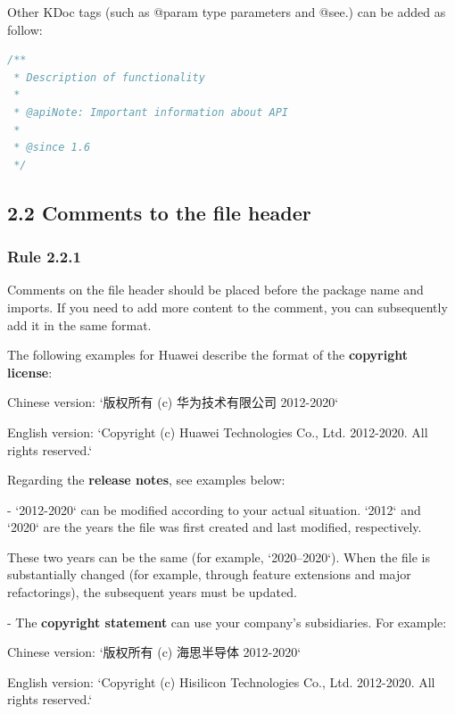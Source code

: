 Other KDoc tags (such as @param type parameters and @see.) can be added as follow:

\begin{lstlisting}[language=Kotlin]
/**
 * Description of functionality
 *
 * @apiNote: Important information about API
 *
 * @since 1.6
 */
\end{lstlisting}
\subsection*{\textbf{2.2 Comments to the file header}}

\subsubsection*{\textbf{Rule 2.2.1}}
\leavevmode\newline



Comments on the file header should be placed before the package name and imports. If you need to add more content to the comment, you can subsequently add it in the same format.



The following examples for Huawei describe the format of the \textbf{copyright license}: \

Chinese version: `版权所有 (c) 华为技术有限公司 2012-2020` \

English version: `Copyright (c) Huawei Technologies Co., Ltd. 2012-2020. All rights reserved.`



Regarding the \textbf{release notes}, see examples below:



- `2012-2020` can be modified according to your actual situation. `2012` and `2020` are the years the file was first created and last modified, respectively.

These two years can be the same (for example, `2020–2020`). When the file is substantially changed (for example, through feature extensions and major refactorings), the subsequent years must be updated.



- The \textbf{copyright statement} can use your company's subsidiaries. For example: \

Chinese version: `版权所有 (c) 海思半导体 2012-2020` \

English version: `Copyright (c) Hisilicon Technologies Co., Ltd. 2012-2020. All rights reserved.`



